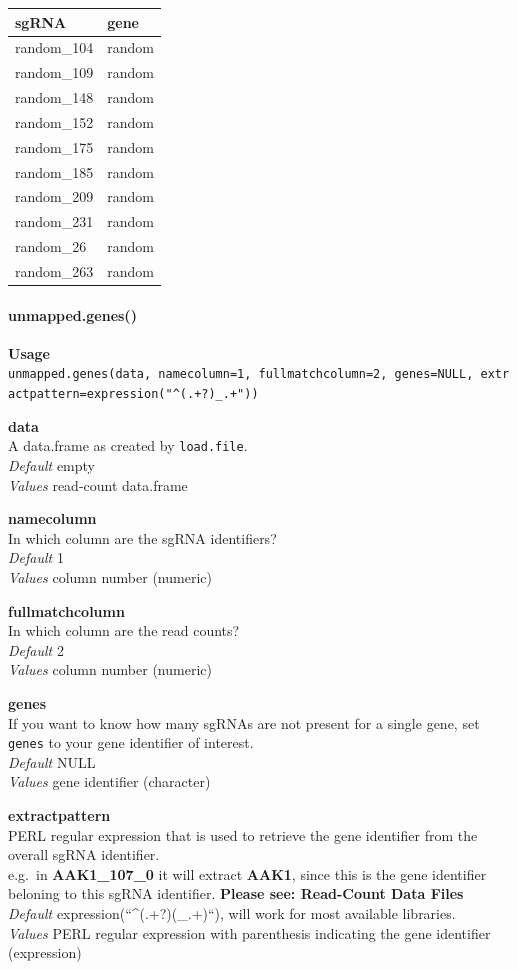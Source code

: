 \documentclass[]{article}
\let\oldparagraph\paragraph
\renewcommand{\paragraph}[1]{\oldparagraph{#1}\mbox{}}
\begin{document}
\begin{longtable}[c]{@{}ll@{}}
\toprule
sgRNA & gene\tabularnewline
\midrule
\endhead
random\_104 & random\tabularnewline
random\_109 & random\tabularnewline
random\_148 & random\tabularnewline
random\_152 & random\tabularnewline
random\_175 & random\tabularnewline
random\_185 & random\tabularnewline
random\_209 & random\tabularnewline
random\_231 & random\tabularnewline
random\_26 & random\tabularnewline
random\_263 & random\tabularnewline
\bottomrule
\end{longtable}

\paragraph{unmapped.genes()}\label{unmapped.genes}

\textbf{Usage}\\
\texttt{unmapped.genes(data,\ namecolumn=1,\ fullmatchcolumn=2,\ genes=NULL,\ extractpattern=expression("\^{}(.+?)\_.+"))}

\textbf{data}\\
A data.frame as created by \texttt{load.file}.\\
\emph{Default} empty\\
\emph{Values} read-count data.frame

\textbf{namecolumn}\\
In which column are the sgRNA identifiers?\\
\emph{Default} 1\\
\emph{Values} column number (numeric)

\textbf{fullmatchcolumn}\\
In which column are the read counts?\\
\emph{Default} 2\\
\emph{Values} column number (numeric)

\textbf{genes}\\
If you want to know how many sgRNAs are not present for a single gene,
set \texttt{genes} to your gene identifier of interest.\\
\emph{Default} NULL\\
\emph{Values} gene identifier (character)

\textbf{extractpattern}\\
PERL regular expression that is used to retrieve the gene identifier
from the overall sgRNA identifier.\\
e.g.~in \textbf{AAK1\_107\_0} it will extract \textbf{AAK1}, since this
is the gene identifier beloning to this sgRNA identifier. \textbf{Please
see: Read-Count Data Files}\\
\emph{Default} expression(``\^{}(.+?)(\_.+)``), will work for most
available libraries.\\
\emph{Values} PERL regular expression with parenthesis indicating the
gene identifier (expression)
\end{document}
